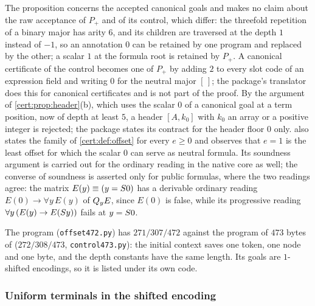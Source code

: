 \begin{remark}\label{cert:rem:offset}
The proposition concerns the accepted canonical goals and makes no claim about
the raw acceptance of $P_{+}$ and of its control, which differ: the threefold
repetition of a binary major has arity $6$, and its children are traversed at
the depth $1$ instead of $-1$, so an annotation $0$ can be retained by one
program and replaced by the other; a scalar $1$ at the formula root is retained
by $P_{+}$. A canonical certificate of the control becomes one of $P_{+}$ by
adding $2$ to every slot code of an expression field and writing $0$ for the
neutral major $[\,]$; the package's translator does this for canonical
certificates and is not part of the proof. By the argument of
\cref{cert:prop:header}(b), which uses the scalar $0$ of a canonical goal at a
term position, now of depth at least $5$, a header $[A,k_0]$ with $k_0$ an
array or a positive integer is rejected; the package states its contract for the
header floor $0$ only.  also states the family of
\cref{cert:def:offset} for every $e\ge 0$ and observes that $e=1$ is the least
offset for which the scalar $0$ can serve as neutral formula. Its soundness
argument is carried out for the ordinary reading in the native core as well;
the converse of soundness is asserted only for public formulas, where the two
readings agree: the matrix $E(y)\equiv(y=S 0)$ has a derivable ordinary
reading $E(0)\to\forall y\,E(y)$ of $Q_{y}E$, since $E(0)$ is false, while its
progressive reading $\forall y\,(E(y)\to E(S y))$ fails at $y=S 0$.
\end{remark}

The program (\texttt{offset472.py}) has $271/307/472$ against the program of
$473$ bytes of  ($272/308/473$,
\texttt{control473.py}): the initial context saves one token, one node and one
byte, and the depth constants have the same length. Its goals are $1$-shifted
encodings, so it is listed under its own code.

\subsubsection*{Uniform terminals in the shifted encoding}


